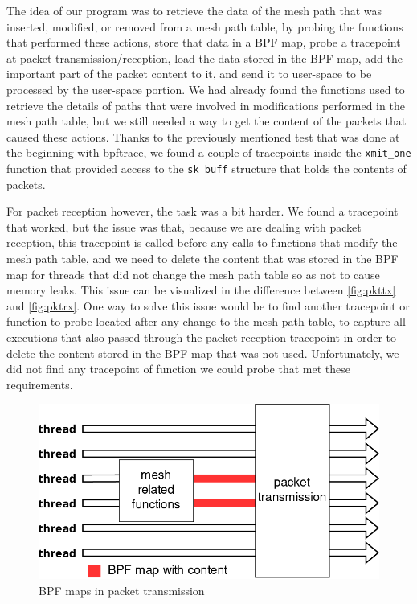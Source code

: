 The idea of our program was to retrieve the data of the mesh path that was
inserted, modified, or removed from a mesh path table, by probing the functions
that performed these actions, store that data in a BPF map, probe a tracepoint
at packet transmission/reception, load the data stored in the BPF map, add the
important part of the packet content to it, and send it to user-space to be
processed by the user-space portion. We had already found the functions used to
retrieve the details of paths that were involved in modifications performed in
the mesh path table, but we still needed a way to get the content of the packets
that caused these actions. Thanks to the previously mentioned test that was done
at the beginning with bpftrace, we found a couple of tracepoints inside the
\texttt{xmit\_one} function that provided access to the \texttt{sk\_buff}
structure that holds the contents of packets.

For packet reception however, the task was a bit harder. We found a tracepoint
that worked, but the issue was that, because we are dealing with packet
reception, this tracepoint is called before any calls to functions that modify
the mesh path table, and we need to delete the content that was stored in the
BPF map for threads that did not change the mesh path table so as not to cause
memory leaks. This issue can be visualized in the difference between
\autoref{fig:pkttx} and \autoref{fig:pktrx}. One way to solve this issue would
be to find another tracepoint or function to probe located after any change to
the mesh path table, to capture all executions that also passed through the
packet reception tracepoint in order to delete the content stored in the BPF map
that was not used. Unfortunately, we did not find any tracepoint of function we
could probe that met these requirements.

\begin{figure}[htb]
   \centering
   \includegraphics[scale=.4]{pktout}
   \caption{BPF maps in packet transmission}\label{fig:pkttx}
\end{figure}

